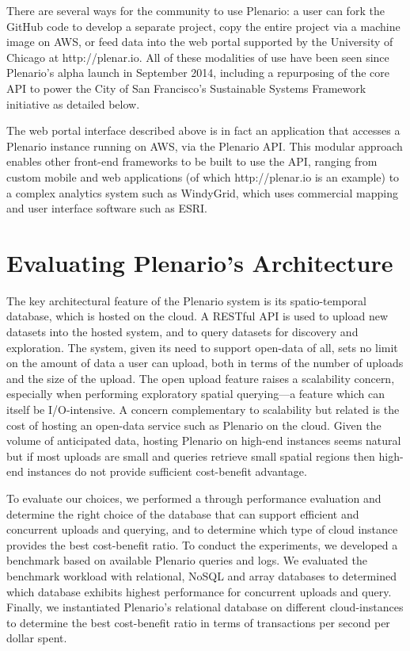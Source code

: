 \documentclass[11pt]{article}
\begin{document}
There are several ways for the community to use Plenario: a user can fork the GitHub code to develop a separate project, copy the entire project via a machine image on AWS, or feed data into the web portal supported by the University of Chicago at http://plenar.io. All of these modalities of use have been seen since Plenario's alpha launch in September 2014, including a repurposing of the core API to power the City of San Francisco's Sustainable Systems Framework initiative as detailed below. 

The web portal interface described above is in fact an application that accesses a Plenario instance running on AWS, via the Plenario API. This modular approach enables other front-end frameworks to be built to use the API, ranging from custom mobile and web applications (of which http://plenar.io is an example) to a complex analytics system such as WindyGrid, which uses commercial mapping and user interface software such as ESRI.

\section{Evaluating Plenario's Architecture}
The key architectural feature of the Plenario system is its spatio-temporal database, which is hosted on the cloud. A RESTful API is used to upload new datasets into the hosted system, and to query datasets for discovery and exploration. The system, given its need to support open-data of all, sets no limit on the amount of data a user can upload, both in terms of  the number of uploads and the size of the upload. The open upload feature raises a scalability concern, especially when performing exploratory spatial querying---a feature which can itself be I/O-intensive. A concern complementary to scalability but related is the cost of hosting an open-data service such as Plenario on the cloud. Given the volume of anticipated data, hosting Plenario on high-end instances seems natural but if most uploads are small and queries retrieve small spatial regions then high-end instances do not provide sufficient cost-benefit advantage. 

To evaluate our choices, we performed a through performance evaluation and determine the right choice of the database that can support efficient and concurrent uploads and querying, and to determine which type of cloud instance provides the best cost-benefit ratio. To conduct the experiments, we developed a benchmark based on available Plenario queries and logs. We evaluated the benchmark workload with relational, NoSQL and array databases to determined which database exhibits highest performance for concurrent uploads and query. Finally, we instantiated Plenario's relational database on different cloud-instances to determine the best cost-benefit ratio in terms of transactions per second per dollar spent.
\end{document}
